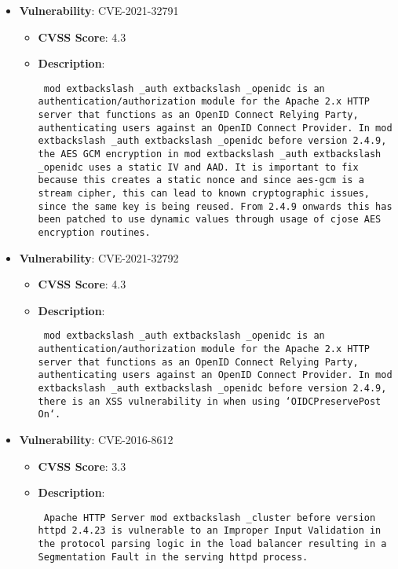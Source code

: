 \documentclass{article}
\begin{document}
\begin{itemize}
        \item \textbf{Vulnerability}: CVE-2021-32791
        \begin{itemize}
            \item \textbf{CVSS Score}:  4.3 
            \item \textbf{Description}: \parbox{\linewidth}{\texttt{ mod	extbackslash _auth	extbackslash _openidc is an authentication/authorization module for the Apache 2.x HTTP server that functions as an OpenID Connect Relying Party, authenticating users against an OpenID Connect Provider. In mod	extbackslash _auth	extbackslash _openidc before version 2.4.9, the AES GCM encryption in mod	extbackslash _auth	extbackslash _openidc uses a static IV and AAD. It is important to fix because this creates a static nonce and since aes-gcm is a stream cipher, this can lead to known cryptographic issues, since the same key is being reused. From 2.4.9 onwards this has been patched to use dynamic values through usage of cjose AES encryption routines. }}
        \end{itemize}
    
        \item \textbf{Vulnerability}: CVE-2021-32792
        \begin{itemize}
            \item \textbf{CVSS Score}:  4.3 
            \item \textbf{Description}: \parbox{\linewidth}{\texttt{ mod	extbackslash _auth	extbackslash _openidc is an authentication/authorization module for the Apache 2.x HTTP server that functions as an OpenID Connect Relying Party, authenticating users against an OpenID Connect Provider. In mod	extbackslash _auth	extbackslash _openidc before version 2.4.9, there is an XSS vulnerability in when using `OIDCPreservePost On`. }}
        \end{itemize}
    
        \item \textbf{Vulnerability}: CVE-2016-8612
        \begin{itemize}
            \item \textbf{CVSS Score}:  3.3 
            \item \textbf{Description}: \parbox{\linewidth}{\texttt{ Apache HTTP Server mod	extbackslash _cluster before version httpd 2.4.23 is vulnerable to an Improper Input Validation in the protocol parsing logic in the load balancer resulting in a Segmentation Fault in the serving httpd process. }}
        \end{itemize}
    

\end{itemize}
\end{document}
